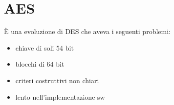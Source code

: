 \chapter{AES}

È una evoluzione di DES che aveva i seguenti problemi:
\begin{itemize}
    \item chiave di soli 54 bit 
    \item blocchi di 64 bit 
    \item criteri costruttivi non chiari 
    \item lento nell'implementazione sw
\end{itemize}